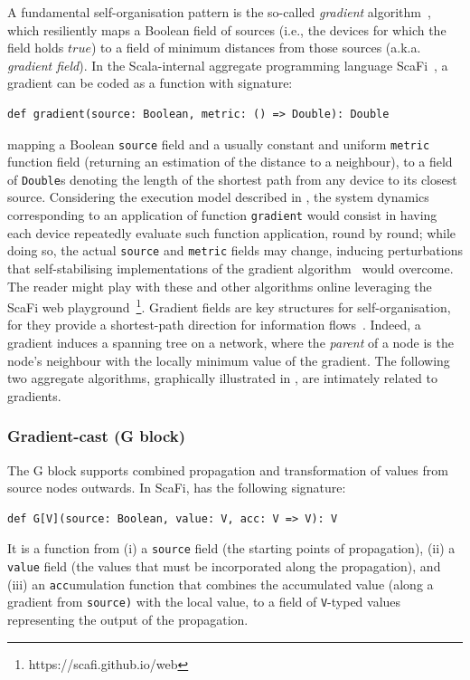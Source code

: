 A fundamental self-organisation pattern
 is the so-called \emph{gradient} algorithm~\cite{DBLP:conf/saso/AudritoCDV17},
 which resiliently maps 
 a Boolean field of sources 
 (i.e., the devices for which the field holds $true$) %
 to a field of minimum distances from those sources
 (a.k.a. \emph{gradient field}).
%
In the Scala-internal aggregate programming language ScaFi~\cite{DBLP:conf/isola/CasadeiVAD20},
 a gradient can be coded as a function 
  with signature:
\begin{lstlisting}
def gradient(source: Boolean, metric: () => Double): Double
\end{lstlisting}
mapping a Boolean \lstinline|source| field
 and a usually constant and uniform \lstinline|metric| function field (returning an estimation of the distance to a neighbour),
 to a field of \lstinline|Double|s 
 denoting the length of the shortest path from any device to its closest source.
%
Considering the execution model described in ,
 the system dynamics corresponding to an application of function \lstinline|gradient|  would consist in having each device
 repeatedly evaluate such function application,
 round by round;
 while doing so, 
 the actual \lstinline|source| and \lstinline|metric| fields may change, inducing perturbations
 that self-stabilising implementations of the gradient algorithm~\cite{DBLP:journals/tomacs/ViroliABDP18} would overcome.
%
The reader might play with these and other algorithms online leveraging the ScaFi web playground~\cite{DBLP:conf/coordination/AguzziCMPV21}\footnote{https://scafi.github.io/web}.
%
Gradient fields are key structures for self-organisation,
 for they provide a shortest-path direction for information flows~\cite{DBLP:conf/saso/WolfH07}.
%
Indeed, a gradient induces a spanning tree on a network,
 where the \emph{parent} of a node 
 is the node's neighbour with the locally minimum value of the gradient.
%
The following two aggregate algorithms, graphically illustrated in , are intimately related to gradients.
 
\subsubsection{Gradient-cast (G block)}
%
The G block supports combined propagation and transformation of values from source nodes outwards.
%
In ScaFi,
  has the following signature:
\begin{lstlisting}[language=scafi]
def G[V](source: Boolean, value: V, acc: V => V): V
\end{lstlisting}
It is a function
 from 
 (i) a \lstinline|source| field (the starting points of propagation),
 (ii) a \lstinline|value| field (the values that must be incorporated along the propagation),
 and 
 (iii) %
 an \lstinline|acc|umulation function
 that combines
  the accumulated value (along a gradient from \lstinline|source)| with the local value,
  to a field of \lstinline|V|-typed values
  representing the output of the propagation.
%

